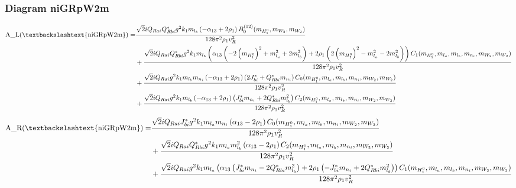 \documentclass{article}
\begin{document}
\subsubsection{Diagram niGRpW2m}
\begin{align*}
\mathtt{\text{A\_L(\textbackslashtext\{niGRpW2m\})}} = & \frac{\sqrt{2} i Q_{Rai} Q_{Rbi}^* g^{2} k_{1} m_{l_b} \left(- \alpha_{13} + 2 \rho_{1}\right) B^{\left(12\right)}_0(m_{H_1^0}, m_{W_2}, m_{W_2})}{128 \pi^{2} \rho_{1} v_{R}^{2}} \\
& + \frac{\sqrt{2} i Q_{Rai} Q_{Rbi}^* g^{2} k_{1} m_{l_b} \left(\alpha_{13} \left(- 2 \left(m_{H_1^0}\right)^{2} + m_{l_a}^{2} + 2 m_{l_b}^{2}\right) + 2 \rho_{1} \left(2 \left(m_{H_1^0}\right)^{2} - m_{l_a}^{2} - 2 m_{l_b}^{2}\right)\right) C_1(m_{H_1^0}, m_{l_a}, m_{l_b}, m_{n_i}, m_{W_2}, m_{W_2})}{128 \pi^{2} \rho_{1} v_{R}^{2}} \\
& + \frac{\sqrt{2} i Q_{Rai} g^{2} k_{1} m_{l_b} m_{n_i} \left(- \alpha_{13} + 2 \rho_{1}\right) \left(2 J_{bi}^* + Q_{Rbi}^* m_{n_i}\right) C_0(m_{H_1^0}, m_{l_a}, m_{l_b}, m_{n_i}, m_{W_2}, m_{W_2})}{128 \pi^{2} \rho_{1} v_{R}^{2}} \\
& + \frac{\sqrt{2} i Q_{Rai} g^{2} k_{1} m_{l_b} \left(- \alpha_{13} + 2 \rho_{1}\right) \left(J_{bi}^* m_{n_i} + 2 Q_{Rbi}^* m_{l_b}^{2}\right) C_2(m_{H_1^0}, m_{l_a}, m_{l_b}, m_{n_i}, m_{W_2}, m_{W_2})}{128 \pi^{2} \rho_{1} v_{R}^{2}} 
\end{align*}
\begin{align*}
\mathtt{\text{A\_R(\textbackslashtext\{niGRpW2m\})}} = & \frac{\sqrt{2} i Q_{Rai} J_{bi}^* g^{2} k_{1} m_{l_a} m_{n_i} \left(\alpha_{13} - 2 \rho_{1}\right) C_0(m_{H_1^0}, m_{l_a}, m_{l_b}, m_{n_i}, m_{W_2}, m_{W_2})}{128 \pi^{2} \rho_{1} v_{R}^{2}} \\
& + \frac{\sqrt{2} i Q_{Rai} Q_{Rbi}^* g^{2} k_{1} m_{l_a} m_{l_b}^{2} \left(\alpha_{13} - 2 \rho_{1}\right) C_2(m_{H_1^0}, m_{l_a}, m_{l_b}, m_{n_i}, m_{W_2}, m_{W_2})}{128 \pi^{2} \rho_{1} v_{R}^{2}} \\
& + \frac{\sqrt{2} i Q_{Rai} g^{2} k_{1} m_{l_a} \left(\alpha_{13} \left(J_{bi}^* m_{n_i} - 2 Q_{Rbi}^* m_{l_b}^{2}\right) + 2 \rho_{1} \left(- J_{bi}^* m_{n_i} + 2 Q_{Rbi}^* m_{l_b}^{2}\right)\right) C_1(m_{H_1^0}, m_{l_a}, m_{l_b}, m_{n_i}, m_{W_2}, m_{W_2})}{128 \pi^{2} \rho_{1} v_{R}^{2}} 
\end{align*}
\end{document}
